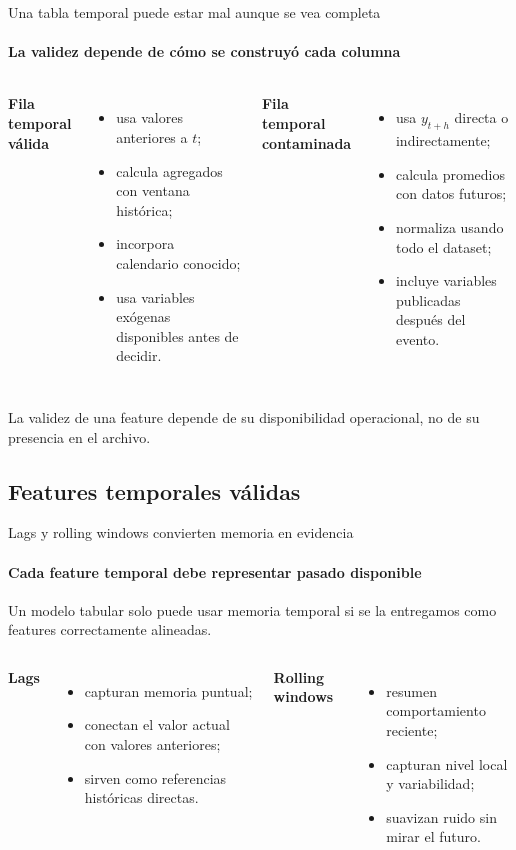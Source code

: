 \documentclass[aspectratio=169,11pt]{beamer}  %
\newcommand{\Lg}{\fontsize{16}{20}\selectfont}
\newcommand{\bigstate}[1]{\begin{center}\Lg #1\end{center}}
\begin{document}
\begin{frame}{Una tabla temporal puede estar mal aunque se vea completa}
\framesubtitle{La validez depende de cómo se construyó cada columna}
\begin{columns}[T]
\textbf{Fila temporal válida}
\begin{itemize}
\item usa valores anteriores a $t$;
\item calcula agregados con ventana histórica;
\item incorpora calendario conocido;
\item usa variables exógenas disponibles antes de decidir.
\end{itemize}
\textbf{Fila temporal contaminada}
\begin{itemize}
\item usa $y_{t+h}$ directa o indirectamente;
\item calcula promedios con datos futuros;
\item normaliza usando todo el dataset;
\item incluye variables publicadas después del evento.
\end{itemize}
\end{columns}
\begin{rulebox}
La validez de una feature depende de su disponibilidad operacional, no de su presencia en el archivo.
\end{rulebox}
\end{frame}

\subsection{Features temporales válidas}

\begin{frame}{Lags y rolling windows convierten memoria en evidencia}
\framesubtitle{Cada feature temporal debe representar pasado disponible}
\bigstate{Un modelo tabular solo puede usar memoria temporal si se la entregamos como features correctamente alineadas.}
\begin{columns}[T]
\textbf{Lags}
\begin{itemize}
\item capturan memoria puntual;
\item conectan el valor actual con valores anteriores;
\item sirven como referencias históricas directas.
\end{itemize}
\textbf{Rolling windows}
\begin{itemize}
\item resumen comportamiento reciente;
\item capturan nivel local y variabilidad;
\item suavizan ruido sin mirar el futuro.
\end{itemize}
\end{columns}
\end{frame}
\end{document}
